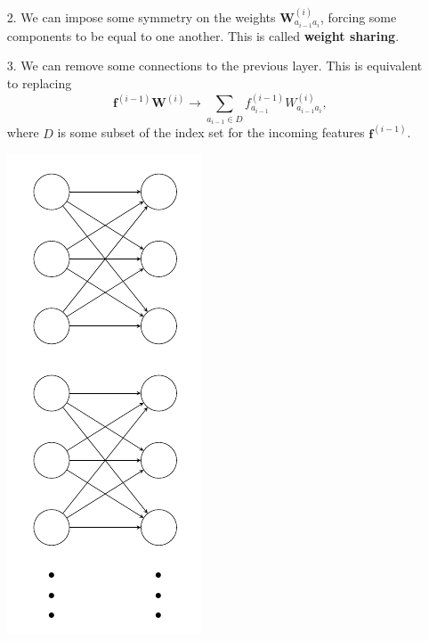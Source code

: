 \documentclass[12pt,t]{beamer}
\begin{document}
\begin{frame}
\begin{itemize}
\item[2.]  We can impose some symmetry on the weights $\mathbf{W}^{(i)}_{a_{i-1}a_i}$, forcing some components to be equal to one another. This is called {\bf weight sharing}.
\item[3.] We can remove some connections to the previous layer. This is equivalent to replacing 
$$ \mathbf{f}^{(i-1)} \mathbf{W}^{(i)} \rightarrow \sum_{a_{i-1} \in D} f^{(i-1)}_{a_{i-1}} W^{(i)}_{a_{i-1}a_i},$$
where $D$ is some subset of the index set for the incoming features $\mathbf{f}^{(i-1)}$. 
\centerline{
\includegraphics[height=0.4\textheight]{./images/semiconnect.png}
} 
\end{itemize}
\end{frame}
\end{document}
